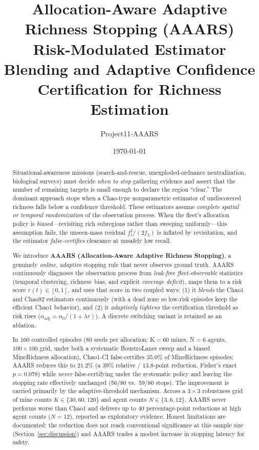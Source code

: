 \documentclass[11pt]{article}
\title{\textbf{Allocation-Aware Adaptive Richness Stopping (AAARS)\\[4pt]
\large Risk-Modulated Estimator Blending and Adaptive Confidence Certification for Richness Estimation}}
\author{Project11-AAARS}
\date{\today}
\begin{document}
\maketitle

\begin{abstract}
Situational-awareness missions (search-and-rescue, unexploded-ordnance neutralization,
biological surveys) must decide \emph{when to stop} gathering evidence and assert that the
number of remaining targets is small enough to declare the region ``clear.'' The dominant
approach stops when a Chao-type nonparametric estimator of undiscovered richness falls below a
confidence threshold. These estimators assume \emph{complete spatial or temporal randomization}
of the observation process. When the fleet's allocation policy is \emph{biased}---revisiting rich
subregions rather than sweeping uniformly---this assumption fails, the unseen-mass residual
$f_1^2/(2f_2)$ is inflated by revisitation, and the estimator \emph{false-certifies} clearance at
unsafely low recall.

We introduce \textbf{AAARS (Allocation-Aware Adaptive Richness Stopping)}, a genuinely
\emph{online}, \emph{adaptive} stopping rule that never observes ground truth. AAARS continuously
diagnoses the observation process from \emph{leak-free fleet-observable} statistics (temporal
clustering, richness~bias, and explicit \emph{coverage deficit}), maps them to a risk score
$r(t)\in[0,1]$, and uses that score in two coupled ways: (1) it \emph{blends} the Chao1 and Chao92
estimators continuously (with a dead zone so low-risk episodes keep the efficient Chao1 behavior),
and (2) it \emph{adaptively tightens} the certification threshold as risk rises
($\alpha_{\mathrm{adj}}=\alpha_0/(1+\lambda r)$). A discrete switching variant is retained as an
ablation.

In 160 controlled episodes (80 seeds per allocation; K$=$60 mines, N$=$6 agents, $100\times100$ grid,
under both a systematic BoustroLanes sweep and a biased MineRichness allocation), Chao1-CI
false-certifies $35.0\%$ of MineRichness episodes; AAARS reduces this to $21.2\%$ (a $39\%$ relative
/ $13.8$-point reduction, Fisher's exact $p=0.078$) while \emph{never} false-certifying under the
systematic policy and leaving the stopping rate effectively unchanged (56/80 vs.\ 59/80 stops). The
improvement is carried primarily by the adaptive-threshold mechanism. Across a $3\times3$
robustness grid of mine counts $K\in\{30,60,120\}$ and agent counts $N\in\{3,6,12\}$, AAARS never
performs worse than Chao1 and delivers up to $40$ percentage-point reductions at high agent
counts ($N=12$), reported as exploratory evidence. Honest limitations are documented: the reduction
does not reach conventional significance at this sample size (Section~\ref{sec:discussion}) and
AAARS trades a modest increase in stopping latency for safety.
\end{abstract}
\end{document}
